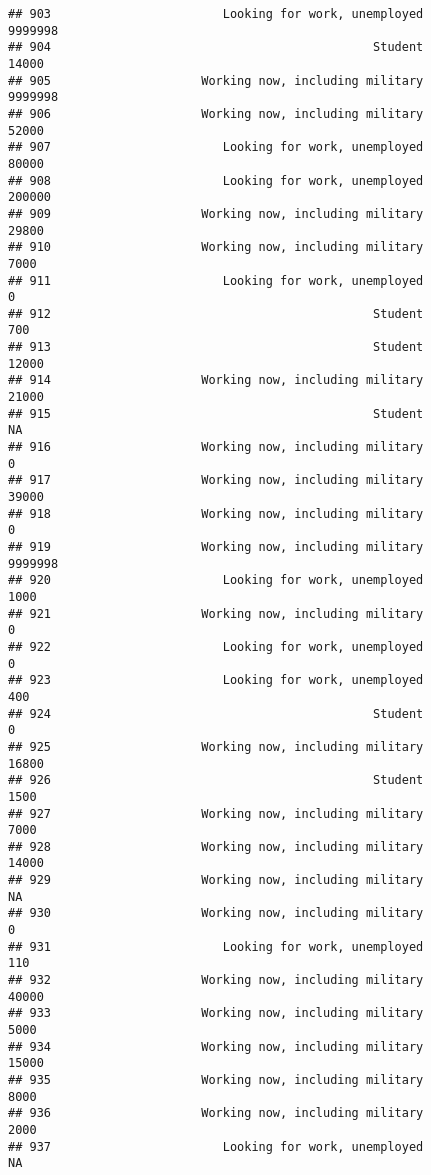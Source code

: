 \documentclass[]{book}
\theoremstyle{definition}
\theoremstyle{definition}
\theoremstyle{remark}
\begin{document}
\begin{verbatim}
## 903                        Looking for work, unemployed         9999998
## 904                                             Student           14000
## 905                     Working now, including military         9999998
## 906                     Working now, including military           52000
## 907                        Looking for work, unemployed           80000
## 908                        Looking for work, unemployed          200000
## 909                     Working now, including military           29800
## 910                     Working now, including military            7000
## 911                        Looking for work, unemployed               0
## 912                                             Student             700
## 913                                             Student           12000
## 914                     Working now, including military           21000
## 915                                             Student              NA
## 916                     Working now, including military               0
## 917                     Working now, including military           39000
## 918                     Working now, including military               0
## 919                     Working now, including military         9999998
## 920                        Looking for work, unemployed            1000
## 921                     Working now, including military               0
## 922                        Looking for work, unemployed               0
## 923                        Looking for work, unemployed             400
## 924                                             Student               0
## 925                     Working now, including military           16800
## 926                                             Student            1500
## 927                     Working now, including military            7000
## 928                     Working now, including military           14000
## 929                     Working now, including military              NA
## 930                     Working now, including military               0
## 931                        Looking for work, unemployed             110
## 932                     Working now, including military           40000
## 933                     Working now, including military            5000
## 934                     Working now, including military           15000
## 935                     Working now, including military            8000
## 936                     Working now, including military            2000
## 937                        Looking for work, unemployed              NA

\end{verbatim}
\end{document}
